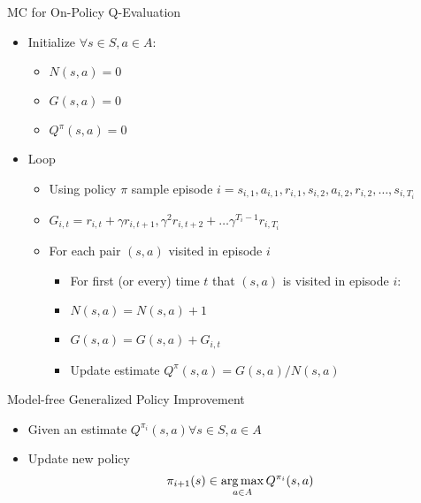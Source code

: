 \documentclass[aspectratio=169]{../latex_main/tntbeamer}  %
\begin{document}
\begin{frame}[c]{MC for On-Policy Q-Evaluation}
	
	\begin{itemize}
		\item Initialize $\forall s\in S, a\in A$:
		\begin{itemize}
			\item $N(s,a) = 0$
			\item $G(s,a) = 0$
			\item $Q^\pi(s,a) =0$
		\end{itemize}
		\item Loop
		\begin{itemize}
			\item Using policy $\pi$ sample episode $i = s_{i,1}, a_{i,1}, r_{i,1}, s_{i,2}, a_{i,2}, r_{i,2}, \ldots, s_{i, T_i}$
			\item $G_{i,t} = r_{i,t} + \gamma r_{i,t+1}, \gamma^2 r_{i,t+2} + \ldots \gamma^{T_i -1} r_{i,T_i}$
			\item For each pair $(s,a)$ visited in episode $i$
			\begin{itemize}
				\item For first (or every) time $t$ that $(s,a)$ is visited in episode $i$:
				\item $N(s,a) = N(s,a) + 1$
				\item $G(s,a) = G(s,a) + G_{i,t}$
				\item Update estimate $Q^\pi(s,a) = G(s,a) /N(s,a)$
			\end{itemize}
		\end{itemize}
	\end{itemize}
	
\end{frame}
\begin{frame}[c]{Model-free Generalized Policy Improvement}
	
	\begin{itemize}
		\item Given an estimate $Q^{\pi_i}(s,a) \forall s\in S, a \in A$
		\item Update new policy
		$$\pi_{i+1}(s) \in \operatorname*{arg\,max}_{a \in A} Q^{\pi_i} (s,a) $$
	\end{itemize}
	
\end{frame}
\end{document}
